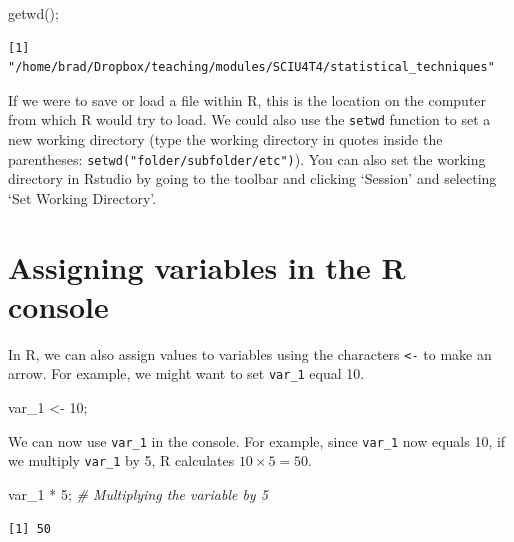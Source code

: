\documentclass[
]{scrbook}
\newenvironment{Shaded}{\begin{snugshade}}{\end{snugshade}}
\newcommand{\CommentTok}[1]{\textcolor[rgb]{0.56,0.35,0.01}{\textit{#1}}}
\newcommand{\DecValTok}[1]{\textcolor[rgb]{0.00,0.00,0.81}{#1}}
\newcommand{\FunctionTok}[1]{\textcolor[rgb]{0.00,0.00,0.00}{#1}}
\newcommand{\NormalTok}[1]{#1}
\newcommand{\OtherTok}[1]{\textcolor[rgb]{0.56,0.35,0.01}{#1}}
\newcommand{\SpecialCharTok}[1]{\textcolor[rgb]{0.00,0.00,0.00}{#1}}
\begin{document}
\begin{Shaded}
\begin{Highlighting}[]
\FunctionTok{getwd}\NormalTok{();}
\end{Highlighting}
\end{Shaded}

\begin{verbatim}
[1] "/home/brad/Dropbox/teaching/modules/SCIU4T4/statistical_techniques"
\end{verbatim}

If we were to save or load a file within R, this is the location on the computer from which R would try to load.
We could also use the \texttt{setwd} function to set a new working directory (type the working directory in quotes inside the parentheses: \texttt{setwd("folder/subfolder/etc")}).
You can also set the working directory in Rstudio by going to the toolbar and clicking `Session' and selecting `Set Working Directory'.

\hypertarget{assigning-variables-in-the-r-console}{%
\section{Assigning variables in the R console}\label{assigning-variables-in-the-r-console}}

In R, we can also assign values to variables using the characters \texttt{\textless{}-} to make an arrow.
For example, we might want to set \texttt{var\_1} equal 10.

\begin{Shaded}
\begin{Highlighting}[]
\NormalTok{var\_1 }\OtherTok{\textless{}{-}} \DecValTok{10}\NormalTok{;}
\end{Highlighting}
\end{Shaded}

We can now use \texttt{var\_1} in the console.
For example, since \texttt{var\_1} now equals 10, if we multiply \texttt{var\_1} by 5, R calculates \(10 \times 5 = 50\).

\begin{Shaded}
\begin{Highlighting}[]
\NormalTok{var\_1 }\SpecialCharTok{*} \DecValTok{5}\NormalTok{; }\CommentTok{\# Multiplying the variable by 5}
\end{Highlighting}
\end{Shaded}

\begin{verbatim}
[1] 50
\end{verbatim}
\end{document}
